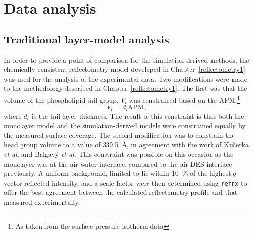 \section{Data analysis}
\subsection{Traditional layer-model analysis}
In order to provide a point of comparison for the simulation-derived methods, the chemically-consistent reflectometry model developed in Chapter~\ref{reflectometry1} was used for the analysis of the experimental data.
Two modifications were made to the methodology described in Chapter~\ref{reflectometry1}.
The first was that the volume of the phospholipid tail group, $V_t$ was constrained based on the APM,\footnote{As taken from the surface pressure-isotherm data}
%
\begin{equation}
V_t = d_t\text{APM},
\end{equation}
%
where $d_t$ is the tail layer thickness.
The result of this constraint is that both the monolayer model and the simulation-derived models were constrained equally by the measured surface coverage.
The second modification was to constrain the head group volume to a value of \SI{339.5}{\angstrom}, in agreement with the work of Ku\v{c}erka \emph{et al.}\autocite{kucerka_determination_2004} and Balgav\'{y} \emph{et al.}\autocite{balgavy_evaluation_2001}
This constraint was possible on this occasion as the monolayer was at the air-water interface, compared to the air-DES interface previously.
A uniform background, limited to lie within \SI{10}{\percent} of the highest $q$-vector reflected intensity, and a scale factor were then determined using \texttt{refnx} to offer the best agreement between the calculated reflectometry profile and that measured experimentally.

